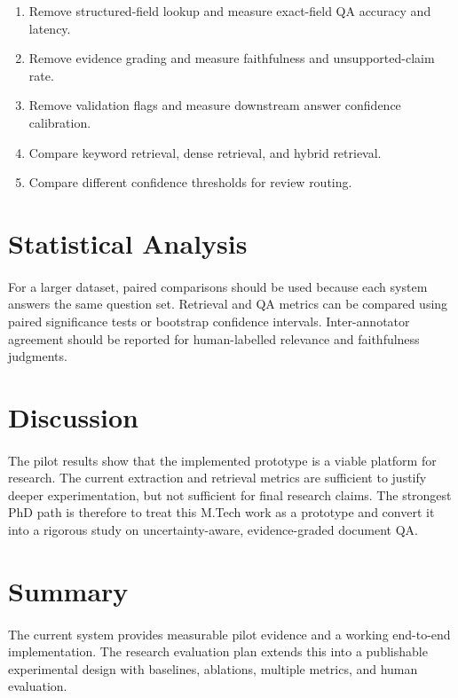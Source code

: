 \begin{enumerate}
    \item Remove structured-field lookup and measure exact-field QA accuracy and latency.
    \item Remove evidence grading and measure faithfulness and unsupported-claim rate.
    \item Remove validation flags and measure downstream answer confidence calibration.
    \item Compare keyword retrieval, dense retrieval, and hybrid retrieval.
    \item Compare different confidence thresholds for review routing.
\end{enumerate}

\section{Statistical Analysis}
\paragraph{} For a larger dataset, paired comparisons should be used because each system answers the same question set. Retrieval and QA metrics can be compared using paired significance tests or bootstrap confidence intervals. Inter-annotator agreement should be reported for human-labelled relevance and faithfulness judgments.

\section{Discussion}
\paragraph{} The pilot results show that the implemented prototype is a viable platform for research. The current extraction and retrieval metrics are sufficient to justify deeper experimentation, but not sufficient for final research claims. The strongest PhD path is therefore to treat this M.Tech work as a prototype and convert it into a rigorous study on uncertainty-aware, evidence-graded document QA.

\section{Summary}
\paragraph{} The current system provides measurable pilot evidence and a working end-to-end implementation. The research evaluation plan extends this into a publishable experimental design with baselines, ablations, multiple metrics, and human evaluation.
